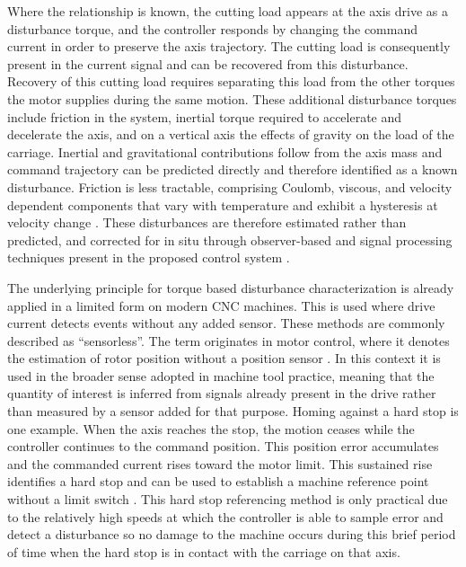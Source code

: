 Where the relationship is known, the cutting load appears at the axis drive as a disturbance torque, and the controller responds by changing the command current in order to preserve the axis trajectory. The cutting load is consequently present in the current signal and can be recovered from this disturbance. Recovery of this cutting load requires separating this load from the other torques the motor supplies during the same motion. These additional disturbance torques include friction in the system, inertial torque required to accelerate and decelerate the axis, and on a vertical axis the effects of gravity on the load of the carriage. Inertial and gravitational contributions follow from the axis mass and command trajectory can be predicted directly and therefore identified as a known disturbance. Friction is less tractable, comprising Coulomb, viscous, and velocity dependent components that vary with temperature and exhibit a hysteresis at velocity change \cite{altintas_manufacturing_2012,armstrong_survey_1994}. These disturbances are therefore estimated rather than predicted, and corrected for in situ through observer-based and signal processing techniques present in the proposed control system \cite{herbst_tuning_2023}.

The underlying principle for torque based disturbance characterization is already applied in a limited form on modern CNC machines. This is used where drive current detects events without any added sensor. These methods are commonly described as “sensorless”. The term originates in motor control, where it denotes the estimation of rotor position without a position sensor \cite{cho_tool_2016,derammelaere_linear_2010}. In this context it is used in the broader sense adopted in machine tool practice, meaning that the quantity of interest is inferred from signals already present in the drive rather than measured by a sensor added for that purpose. Homing against a hard stop is one example. When the axis reaches the stop, the motion ceases while the controller continues to the command position. This position error accumulates and the commanded current rises toward the motor limit. This sustained rise identifies a hard stop and can be used to establish a machine reference point without a limit switch \cite{adi_tmc2209_2023,voron_sensorless}. This hard stop referencing method is only practical due to the relatively high speeds at which the controller is able to sample error and detect a disturbance so no damage to the machine occurs during this brief period of time when the hard stop is in contact with the carriage on that axis.

